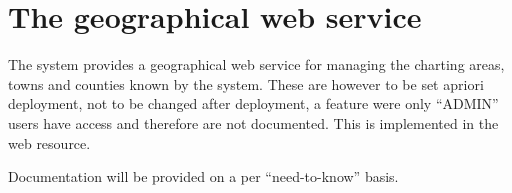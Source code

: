 \section{The geographical web service}

The system provides a geographical web service for managing the charting areas,
towns and counties known by the system. These are however to be set apriori
deployment, not to be changed after deployment, a feature were only ``ADMIN''
users have access and therefore are not documented. This is implemented in the
 web resource.

Documentation will be provided on a per ``need-to-know'' basis.
